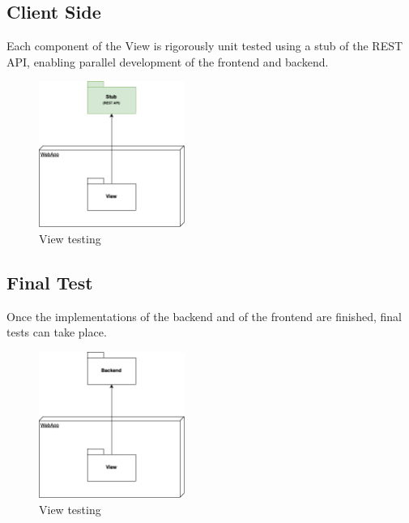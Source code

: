 \newpage

\subsection{Client Side}

Each component of the View is rigorously unit tested using a stub of the REST API, enabling
parallel development of the frontend and backend.

\begin{figure}[H]
    \centering
    \includegraphics[width=180px]{../../assets/pakege-diagram/implementation_plan_5.png}
    \caption{View testing}
\end{figure}


\subsection{Final Test}

Once the implementations of the backend and of the frontend are finished, final tests can take place.

\begin{figure}[H]
    \centering
    \includegraphics[width=180px]{../../assets/pakege-diagram/implementation_plan_6.png}
    \caption{View testing}
\end{figure}





